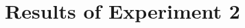 \documentclass[msc,deptreport, cs]{infthesis} %
\begin{document}

\section{Results of Experiment 2}
\end{document}
